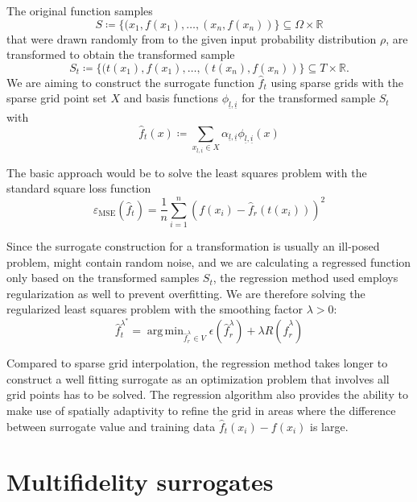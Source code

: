 \documentclass[
  a4paper,  %
  twoside,  %
  bibliography=totoc,
  headsepline,
  cleardoublepage=empty,
  parskip=half,
  draft=false
]{scrbook}
\DeclareMathOperator*{\argmin}{arg\,min}
\begin{document}
The original function samples
\begin{equation}
S \coloneqq \{(x_1, f(x_1), \dots, (x_n, f(x_n))\} \subseteq \Omega \times \mathds{R}
\end{equation}
that were drawn randomly from to the given input probability distribution $\rho$, are transformed to obtain the transformed sample
\begin{equation}
S_t \coloneqq \{(t(x_1), f(x_1), \dots, (t(x_n), f(x_n))\} \subseteq T \times \mathds{R}.
\end{equation}
We are aiming to construct the surrogate function $\hat{f}_t$ using sparse grids with the sparse grid point set $X$ and basis functions $\phi_{\underline{l},\underline{i}}$ for the transformed sample $S_t$ with
\begin{equation}
\hat{f}_t(x) \coloneqq \sum_{x_{\underline{l},\underline{i}} \in X} \alpha_{\underline{l},\underline{i}} \phi_{\underline{l},\underline{i}}(x)
\end{equation}

The basic approach would be to solve the least squares problem with the standard square loss function
\begin{equation}
\varepsilon_{\text{MSE}}(\hat{f}_t)=\frac{1}{n} \sum_{i=1}^n (f(x_i) - \hat{f}_r(t(x_i)))^2 
\end{equation}

Since the surrogate construction for a transformation is usually an ill-posed problem, might contain random noise, and we are calculating a regressed function only based on the transformed samples $S_t$, the regression method used employs regularization as well to prevent overfitting.
We are therefore solving the regularized least squares problem with the smoothing factor $\lambda > 0$:
\begin{equation}
\hat{f}_t^{\lambda^*} = \argmin_{\hat{f}_r^\lambda \in V} \epsilon(\hat{f}_r^\lambda) + \lambda R(\hat{f}_r^\lambda)
\end{equation}

Compared to sparse grid interpolation, the regression method takes longer to construct a well fitting surrogate as an optimization problem that involves all grid points has to be solved.
The regression algorithm also provides the ability to make use of spatially adaptivity to refine the grid in areas where the difference between surrogate value and training data $\hat{f}_t(x_i) - f(x_i)$ is large.


\section{Multifidelity surrogates}
\label{sec:lofi}
\end{document}
